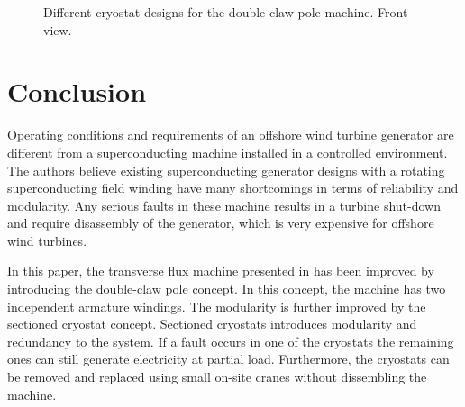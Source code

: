 \documentclass[12pt]{IET02}
\begin{document}
\begin{figure}[]
    \caption{Different cryostat designs for the double-claw pole machine. Front view.} 
    \label{cryostat_variants}
\end{figure}



\section{Conclusion} %
\label{sec:conclusion}

Operating conditions and requirements of an offshore wind turbine generator are different from a superconducting machine installed in a controlled environment. The authors believe existing superconducting generator designs with a rotating superconducting field winding have many shortcomings in terms of reliability and modularity. Any serious faults in these machine results in a turbine shut-down and require disassembly of the generator, which is very expensive for offshore wind turbines.

In this paper, the transverse flux machine presented in \cite{Keysan2011e} has been improved by introducing the double-claw pole concept. In this concept, the machine has two independent armature windings. The modularity is further improved by the sectioned cryostat concept. Sectioned cryostats introduces modularity and redundancy to the system. If a fault occurs in one of the cryostats the remaining ones can still generate electricity at partial load. Furthermore, the cryostats can be removed and replaced using small on-site cranes without dissembling the machine.
\end{document}
